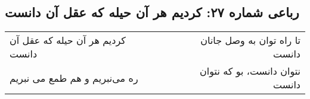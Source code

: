 \begin{center}
\section*{رباعی شماره ۲۷: کردیم هر آن حیله که عقل آن دانست}
\label{sec:027}
\begin{longtable}{l p{0.5cm} r}
کردیم هر آن حیله که عقل آن دانست
&&
تا راه توان به وصل جانان دانست
\\
ره می‌نبریم و هم طمع می نبریم
&&
نتوان دانست، بو که نتوان دانست
\\
\end{longtable}
\end{center}
